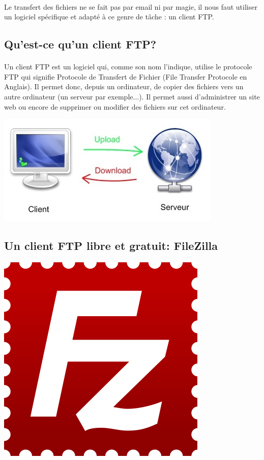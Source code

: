 \documentclass[10pt,a4paper]{article}
\begin{document}
\paragraph{}Le transfert des fichiers ne se fait pas par email ni par magie, il nous faut utiliser un logiciel spécifique et adapté à ce genre de tâche : un client FTP.

\subsection{Qu'est-ce qu'un client FTP?}
\paragraph{}Un client FTP est un logiciel qui, comme son nom l'indique, utilise le protocole FTP qui signifie Protocole de Transfert de Fichier (File Transfer Protocole en Anglais). Il permet donc, depuis un ordinateur, de copier des fichiers vers un autre ordinateur (un serveur par exemple...). Il permet aussi d'administrer un site web ou encore de supprimer ou modifier des fichiers sur cet ordinateur.
\begin{center}
\includegraphics[scale=0.7]{img/0010.jpg}
\end{center}

\subsection{Un client FTP libre et gratuit: FileZilla}
\begin{center}
\includegraphics[scale=0.1]{img/0011.png}
\end{center}
\end{document}
